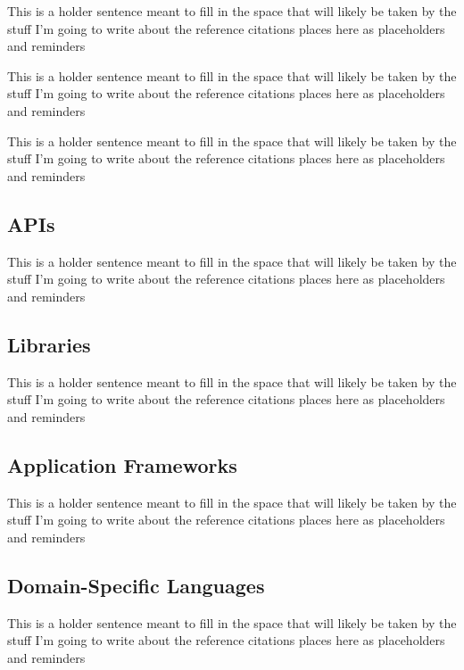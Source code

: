 \cite{shiva2007a-software}

This is a holder sentence meant to fill in the space that will likely be taken by the stuff I'm going to write about the reference citations places here as placeholders and reminders

\cite{mohagheghi2008a-an-empirical}

This is a holder sentence meant to fill in the space that will likely be taken by the stuff I'm going to write about the reference citations places here as placeholders and reminders

\cite{lorenz2011a-code}

This is a holder sentence meant to fill in the space that will likely be taken by the stuff I'm going to write about the reference citations places here as placeholders and reminders

\subsection{APIs}

This is a holder sentence meant to fill in the space that will likely be taken by the stuff I'm going to write about the reference citations places here as placeholders and reminders

\subsection{Libraries}

This is a holder sentence meant to fill in the space that will likely be taken by the stuff I'm going to write about the reference citations places here as placeholders and reminders

\subsection{Application Frameworks}

\cite{polancic2010a-an-empirical}

This is a holder sentence meant to fill in the space that will likely be taken by the stuff I'm going to write about the reference citations places here as placeholders and reminders

\subsection{Domain-Specific Languages}

This is a holder sentence meant to fill in the space that will likely be taken by the stuff I'm going to write about the reference citations places here as placeholders and reminders

